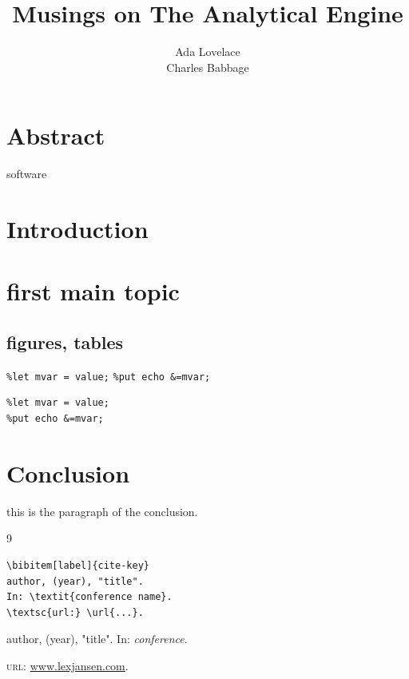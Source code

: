 \documentclass{sugconf}%
\title{Musings on The Analytical Engine}
\author{Ada Lovelace \\ Charles Babbage}%
\begin{document}
\maketitle
{}%
\section{Abstract}%
\SASregistered software %


\section{Introduction}%
\section{first main topic}%
\subsection{figures, tables}%

\texttt{\%let mvar = value;}   \texttt{\%put echo \&=mvar;}

\begin{verbatim}
%let mvar = value;
%put echo &=mvar;
\end{verbatim}

\section{Conclusion}%
this is the paragraph of the conclusion.

\vspace{-1\baselineskip}%
\begin{thebibliography}{9}%

\strut %
\begin{verbatim}
\bibitem[label]{cite-key}
author, (year), "title".
In: \textit{conference name}.
\textsc{url:} \url{...}.
\end{verbatim}

author, (year), "title".
In: \textit{conference}.
\par\textsc{url:} \url{www.lexjansen.com}.

\end{thebibliography}
\end{document}
